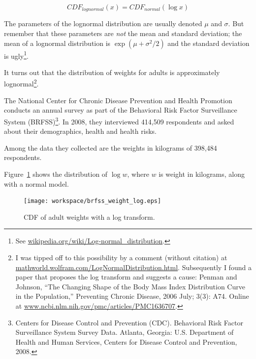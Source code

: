 \documentclass[12pt]{book}
\begin{document}
\[ CDF_{lognormal}(x) = CDF_{normal}(\log x) \]

The parameters of the lognormal distribution are usually denoted $\mu$
and $\sigma$.  But remember that these parameters are {\em not} the
mean and standard deviation; the mean of a lognormal distribution is
$\exp(\mu + \sigma^2/2)$ and the standard deviation is
ugly\footnote{See \url{wikipedia.org/wiki/Log-normal_distribution}.}.

It turns out that the distribution of weights for adults is
approximately lognormal\footnote{I was tipped off to this possibility by a
  comment (without citation) at
  \url{mathworld.wolfram.com/LogNormalDistribution.html}.
  Subsequently I found a paper that proposes the log transform and
  suggests a cause: Penman and Johnson, ``The Changing Shape of the
  Body Mass Index Distribution Curve in the Population,'' Preventing
  Chronic Disease, 2006 July; 3(3): A74.  Online
  at \url{www.ncbi.nlm.nih.gov/pmc/articles/PMC1636707}.}.

The National Center for Chronic Disease
Prevention and Health Promotion conducts an annual survey as part of
the Behavioral Risk Factor Surveillance System
(BRFSS)\footnote{Centers for Disease Control and Prevention
  (CDC). Behavioral Risk Factor Surveillance System Survey
  Data. Atlanta, Georgia: U.S. Department of Health and Human
  Services, Centers for Disease Control and Prevention, 2008.}.  In
2008, they interviewed 414,509 respondents and asked about their
demographics, health and health risks.

Among the data they collected are the weights in kilograms of
398,484 respondents.




Figure~\ref{brfss_weight_log} shows the distribution
of $\log w$, where $w$ is weight in kilograms, along with a normal
model.

\begin{figure}
\centerline{\texttt{[image: workspace/brfss\_weight\_log.eps]}}
\caption{CDF of adult weights with a log transform.}
\label{brfss_weight_log}
\end{figure}
\end{document}
